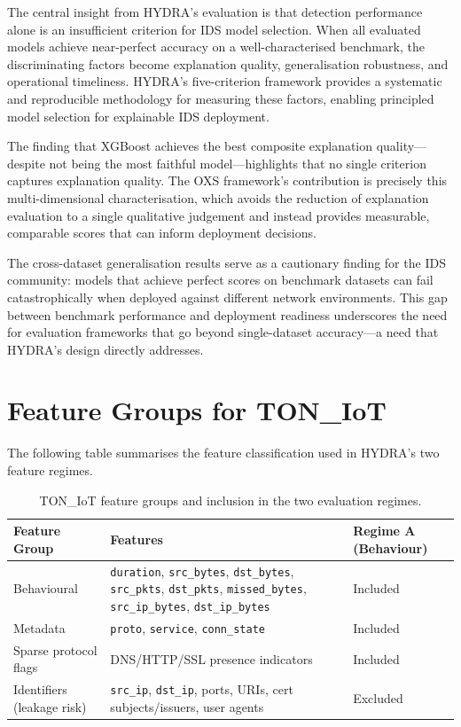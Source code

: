 \documentclass[12pt,a4paper]{report}
\begin{document}
The central insight from HYDRA's evaluation is that detection performance alone is an insufficient criterion for IDS model selection. When all evaluated models achieve near-perfect accuracy on a well-characterised benchmark, the discriminating factors become explanation quality, generalisation robustness, and operational timeliness. HYDRA's five-criterion framework provides a systematic and reproducible methodology for measuring these factors, enabling principled model selection for explainable IDS deployment.

The finding that XGBoost achieves the best composite explanation quality---despite not being the most faithful model---highlights that no single criterion captures explanation quality. The OXS framework's contribution is precisely this multi-dimensional characterisation, which avoids the reduction of explanation evaluation to a single qualitative judgement and instead provides measurable, comparable scores that can inform deployment decisions.

The cross-dataset generalisation results serve as a cautionary finding for the IDS community: models that achieve perfect scores on benchmark datasets can fail catastrophically when deployed against different network environments. This gap between benchmark performance and deployment readiness underscores the need for evaluation frameworks that go beyond single-dataset accuracy---a need that HYDRA's design directly addresses.

\appendix

\chapter{Feature Groups for TON\_IoT}
\label{app:features}

The following table summarises the feature classification used in HYDRA's two feature regimes.

\begin{table}[H]
\centering
\caption{TON\_IoT feature groups and inclusion in the two evaluation regimes.}
\label{tab:features}
\begin{tabular}{p{3.5cm}p{6cm}p{3cm}}
\toprule
\textbf{Feature Group} & \textbf{Features} & \textbf{Regime A (Behaviour)} \\
\midrule
Behavioural & \texttt{duration}, \texttt{src\_bytes}, \texttt{dst\_bytes}, \texttt{src\_pkts}, \texttt{dst\_pkts}, \texttt{missed\_bytes}, \texttt{src\_ip\_bytes}, \texttt{dst\_ip\_bytes} & Included \\
\addlinespace
Metadata & \texttt{proto}, \texttt{service}, \texttt{conn\_state} & Included \\
\addlinespace
Sparse protocol flags & DNS/HTTP/SSL presence indicators & Included \\
\addlinespace
Identifiers (leakage risk) & \texttt{src\_ip}, \texttt{dst\_ip}, ports, URIs, cert subjects/issuers, user agents & Excluded \\
\bottomrule
\end{tabular}
\end{table}
\end{document}
